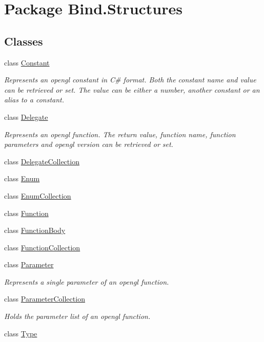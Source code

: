 \hypertarget{namespace_bind_1_1_structures}{
\section{Package Bind.Structures}
\label{namespace_bind_1_1_structures}
}
\subsection*{Classes}
\begin{DoxyCompactItemize}
\item 
class \hyperlink{class_bind_1_1_structures_1_1_constant}{Constant}
\begin{DoxyCompactList}\small\item\em Represents an opengl constant in C\# format. Both the constant name and value can be retrieved or set. The value can be either a number, another constant or an alias to a constant. \item\end{DoxyCompactList}\item 
class \hyperlink{class_bind_1_1_structures_1_1_delegate}{Delegate}
\begin{DoxyCompactList}\small\item\em Represents an opengl function. The return value, function name, function parameters and opengl version can be retrieved or set. \item\end{DoxyCompactList}\item 
class \hyperlink{class_bind_1_1_structures_1_1_delegate_collection}{DelegateCollection}
\item 
class \hyperlink{class_bind_1_1_structures_1_1_enum}{Enum}
\item 
class \hyperlink{class_bind_1_1_structures_1_1_enum_collection}{EnumCollection}
\item 
class \hyperlink{class_bind_1_1_structures_1_1_function}{Function}
\item 
class \hyperlink{class_bind_1_1_structures_1_1_function_body}{FunctionBody}
\item 
class \hyperlink{class_bind_1_1_structures_1_1_function_collection}{FunctionCollection}
\item 
class \hyperlink{class_bind_1_1_structures_1_1_parameter}{Parameter}
\begin{DoxyCompactList}\small\item\em Represents a single parameter of an opengl function. \item\end{DoxyCompactList}\item 
class \hyperlink{class_bind_1_1_structures_1_1_parameter_collection}{ParameterCollection}
\begin{DoxyCompactList}\small\item\em Holds the parameter list of an opengl function. \item\end{DoxyCompactList}\item 
class \hyperlink{class_bind_1_1_structures_1_1_type}{Type}
\end{DoxyCompactItemize}
